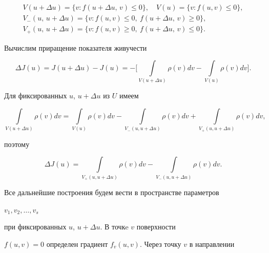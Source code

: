 \begin{gather*}


V(u+\Delta u)=\{v:f(u+\Delta u,\, v)\le0\},\quad


V(u)=\{v:f(u,v)\le0\},\\


V_-(u,\,u+\Delta u)=\{v:f(u,v)\le0,\ f(u+\Delta u,\,v)\ge0\},\\


V_+(u,\,u+\Delta u)=\{v:f(u,v)\ge0,\ f(u+\Delta u,\,v)\le0\}.


\end{gather*}





Вычислим приращение показателя живучести


$$


\Delta J(u)=J(u+\Delta u)-J(u)=-\bigg[


\int\limits_{V(u+\Delta u)}\rho(v)dv-\int\limits_{V(u)}


\rho(v)dv\bigg].


$$





Для фиксированных $u$, $u+\Delta u$ из $U$ имеем


$$


\int\limits_{V(u+\Delta u)}\rho(v)dv=


\int\limits_{V(u)}\rho(v)dv-


\int\limits_{V_-(u,u+\Delta u)}\rho(v)dv+


\int\limits_{V_+(u,u+\Delta u)}\rho(v)dv,


$$


поэтому


\begin{equation}


\Delta J(u)=\int\limits_{V_+(u,u+\Delta u)}\rho(v)dv-


\int\limits_{V_-(u,u+\Delta u)}\rho(v)dv.


\end{equation}





Все дальнейшие построения будем вести в пространстве параметров 


$v_1,v_2,\dotsc,v_s$


при фиксированных $u$, $u+\Delta u$. В точкe $v$ поверхности


$f(u,v)=0$ определен градиент $f_v(u,v)$. Через точку $v$ в направлении 


